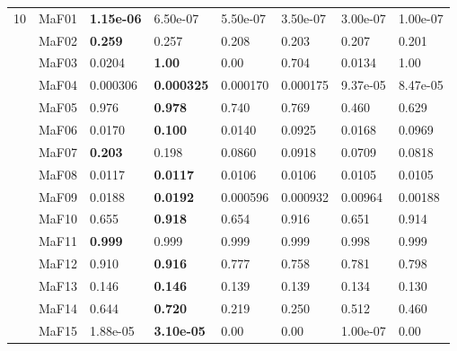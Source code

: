 \documentclass[]{article}
\begin{document}
\begin{landscape}
\begin{table}
\begin{footnotesize}
\begin{tabular}{|l|l|l|l|l|l|l|l|}
\multirow{15}{*}{10} & MaF01 & \cellcolor{gray95} {\bf 1.15e-06} & \cellcolor{gray95} 6.50e-07 & \cellcolor{gray95} 5.50e-07 & \cellcolor{gray95} 3.50e-07 & \cellcolor{gray95} 3.00e-07 & 1.00e-07\\
 & MaF02 & \cellcolor{gray95} {\bf 0.259} & \cellcolor{gray95} 0.257 & 0.208 & 0.203 & 0.207 & 0.201\\
 & MaF03 & 0.0204 & \cellcolor{gray95} {\bf 1.00} & 0.00 & 0.704 & 0.0134 & \cellcolor{gray95} 1.00\\
 & MaF04 & \cellcolor{gray95} 0.000306 & \cellcolor{gray95} {\bf 0.000325} & 0.000170 & 0.000175 & 9.37e-05 & 8.47e-05\\
 & MaF05 & \cellcolor{gray95} 0.976 & \cellcolor{gray95} {\bf 0.978} & 0.740 & 0.769 & 0.460 & 0.629\\
 & MaF06 & 0.0170 & \cellcolor{gray95} {\bf 0.100} & 0.0140 & \cellcolor{gray95} 0.0925 & 0.0168 & \cellcolor{gray95} 0.0969\\
 & MaF07 & \cellcolor{gray95} {\bf 0.203} & \cellcolor{gray95} 0.198 & 0.0860 & 0.0918 & 0.0709 & 0.0818\\
 & MaF08 & \cellcolor{gray95} 0.0117 & \cellcolor{gray95} {\bf 0.0117} & 0.0106 & 0.0106 & 0.0105 & 0.0105\\
 & MaF09 & \cellcolor{gray95} 0.0188 & \cellcolor{gray95} {\bf 0.0192} & 0.000596 & 0.000932 & 0.00964 & 0.00188\\
 & MaF10 & 0.655 & \cellcolor{gray95} {\bf 0.918} & 0.654 & \cellcolor{gray95} 0.916 & 0.651 & \cellcolor{gray95} 0.914\\
 & MaF11 & \cellcolor{gray95} {\bf 0.999} & \cellcolor{gray95} 0.999 & 0.999 & 0.999 & 0.998 & 0.999\\
 & MaF12 & \cellcolor{gray95} 0.910 & \cellcolor{gray95} {\bf 0.916} & 0.777 & 0.758 & 0.781 & 0.798\\
 & MaF13 & \cellcolor{gray95} 0.146 & \cellcolor{gray95} {\bf 0.146} & 0.139 & 0.139 & 0.134 & 0.130\\
 & MaF14 & \cellcolor{gray95} 0.644 & \cellcolor{gray95} {\bf 0.720} & 0.219 & 0.250 & 0.512 & 0.460\\
 & MaF15 & \cellcolor{gray95} 1.88e-05 & \cellcolor{gray95} {\bf 3.10e-05} & 0.00 & 0.00 & 1.00e-07 & 0.00\\
\hline


\end{tabular}
\end{footnotesize}
\end{table}
\end{landscape}
\end{document}
